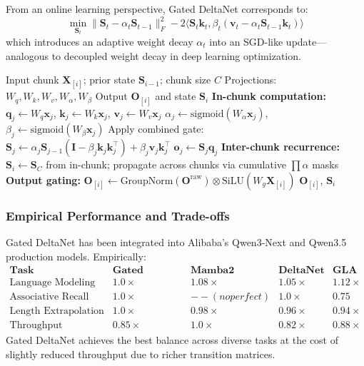 \documentclass[11pt,a4paper]{article}
\begin{document}
From an online learning perspective, Gated DeltaNet corresponds to:
\[
\min_{\mathbf{S}_t} \|\mathbf{S}_t - \alpha_t \mathbf{S}_{t-1}\|_F^2 - 2\langle \mathbf{S}_t \mathbf{k}_t, \beta_t(\mathbf{v}_t - \alpha_t \mathbf{S}_{t-1} \mathbf{k}_t)\rangle
\]
which introduces an adaptive weight decay $\alpha_t$ into an SGD-like update---analogous to decoupled weight decay in deep learning optimization.

\begin{algorithm}[H]
\caption{Gated DeltaNet Parallel Chunkwise Forward}
\begin{algorithmic}[1]
\Require Input chunk  $\mathbf{X}_{[i]}$; prior state $\mathbf{S}_{i-1}$; chunk size $C$
\Require Projections: $W_q, W_k, W_v, W_\alpha, W_\beta$
\Ensure Output $\mathbf{O}_{[i]}$ and state $\mathbf{S}_i$
\State \textbf{In-chunk computation:}
    \State $\mathbf{q}_j \gets W_q \mathbf{x}_j$, $\mathbf{k}_j \gets W_k \mathbf{x}_j$, $\mathbf{v}_j \gets W_v \mathbf{x}_j$
    \State $\alpha_j \gets \text{sigmoid}(W_\alpha \mathbf{x}_j)$, $\beta_j \gets \text{sigmoid}(W_\beta \mathbf{x}_j)$
    \State Apply combined gate: $\mathbf{S}_j \gets \alpha_j \mathbf{S}_{j-1}(\mathbf{I} - \beta_j \mathbf{k}_j \mathbf{k}_j^\top) + \beta_j \mathbf{v}_j \mathbf{k}_j^\top$
    \State $\mathbf{o}_j \gets \mathbf{S}_j \mathbf{q}_j$
\EndFor
\State \textbf{Inter-chunk recurrence:}
\State $\mathbf{S}_i \gets \mathbf{S}_C$ from in-chunk; propagate across chunks via cumulative $\prod \alpha$ masks
\State \textbf{Output gating:} $\mathbf{O}_{[i]} \gets \text{GroupNorm}(\mathbf{O}^\text{raw}) \otimes \text{SiLU}(W_g \mathbf{X}_{[i]})$
\Return $\mathbf{O}_{[i]}$, $\mathbf{S}_i$
\end{algorithmic}
\end{algorithm}

\subsubsection{Empirical Performance and Trade-offs}

Gated DeltaNet has been integrated into Alibaba's Qwen3-Next and Qwen3.5 production models. Empirically:
\[
\begin{array}{l|cccc}
\textbf{Task} & \textbf{Gated DeltaNet} & \textbf{Mamba2} & \textbf{DeltaNet} & \textbf{GLA} \\
\hline
\text{Language Modeling} & \mathbf{1.0\times} & 1.08\times & 1.05\times & 1.12\times \\
\text{Associative Recall} & \mathbf{1.0\times} & --(no perfect) & \mathbf{1.0\times} & 0.75 \\
\text{Length Extrapolation} & \mathbf{1.0\times} & 0.98\times & 0.96\times & 0.94\times \\
\text{Throughput (tokens/sec)} & 0.85\times & \mathbf{1.0\times} & 0.82\times & 0.88\times
\end{array}
\]
Gated DeltaNet achieves the best balance across diverse tasks at the cost of slightly reduced throughput due to richer transition matrices.
\end{document}
